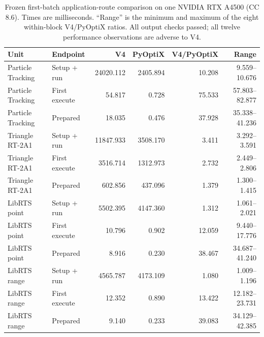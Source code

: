 \begin{table}[t]
  \caption{Frozen first-batch application-route comparison on one NVIDIA RTX
  A4500 (CC 8.6).  Times are milliseconds.  ``Range'' is the minimum and
  maximum of the eight within-block V4/PyOptiX ratios.  All output checks
  passed; all twelve performance observations are adverse to V4.}
  \label{tab:app-pyoptix-results}
  \scriptsize
  \centering
  \begin{tabular}{@{}llrrrr@{}}
    \toprule
    Unit & Endpoint & V4 & PyOptiX & V4/PyOptiX & Range \\
    \midrule
    Particle Tracking & Setup + run & 24020.112 & 2405.894 & 10.208 & 9.559--10.676 \\
    Particle Tracking & First execute & 54.817 & 0.728 & 75.533 & 57.803--82.877 \\
    Particle Tracking & Prepared & 18.035 & 0.476 & 37.928 & 35.338--41.236 \\
    Triangle RT-2A1 & Setup + run & 11847.933 & 3508.170 & 3.411 & 3.292--3.591 \\
    Triangle RT-2A1 & First execute & 3516.714 & 1312.973 & 2.732 & 2.449--2.806 \\
    Triangle RT-2A1 & Prepared & 602.856 & 437.096 & 1.379 & 1.300--1.415 \\
    LibRTS point & Setup + run & 5502.395 & 4147.360 & 1.312 & 1.061--2.021 \\
    LibRTS point & First execute & 10.796 & 0.902 & 12.059 & 9.440--17.776 \\
    LibRTS point & Prepared & 8.916 & 0.230 & 38.467 & 34.687--41.240 \\
    LibRTS range & Setup + run & 4565.787 & 4173.109 & 1.080 & 1.009--1.196 \\
    LibRTS range & First execute & 12.352 & 0.890 & 13.422 & 12.182--23.731 \\
    LibRTS range & Prepared & 9.140 & 0.233 & 39.083 & 34.129--42.385 \\
    \bottomrule
  \end{tabular}
\end{table}

